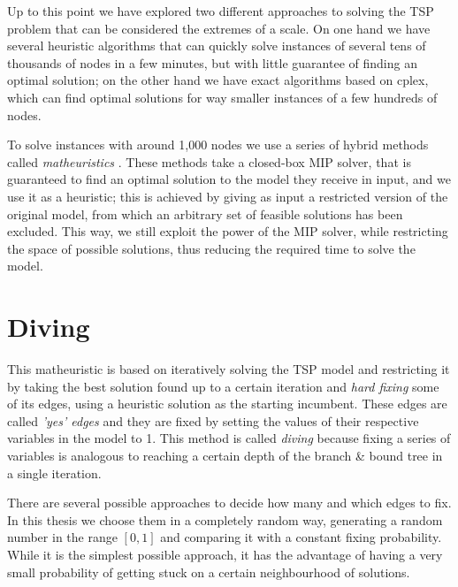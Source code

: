 Up to this point we have explored two different approaches to solving the TSP problem that can be considered the extremes of a scale. On one hand we have several heuristic algorithms that can quickly solve instances of several tens of thousands of nodes in a few minutes, but with little guarantee of finding an optimal solution; on the other hand we have exact algorithms based on cplex, which can find optimal solutions for way smaller instances of a few hundreds of nodes.

To solve instances with around 1,000 nodes we use a series of hybrid methods called \textit{matheuristics} \cite{Fischetti2016}. These methods take a closed-box MIP solver, that is guaranteed to find an optimal solution to the model they receive in input, and we use it as a heuristic; this is achieved by giving as input a restricted version of the original model, from which an arbitrary set of feasible solutions has been excluded. This way, we still exploit the power of the MIP solver, while restricting the space of possible solutions, thus reducing the required time to solve the model.

\section{Diving}

This matheuristic is based on iteratively solving the TSP model and restricting it by taking the best solution found up to a certain iteration and \textit{hard fixing} some of its edges, using a heuristic solution as the starting incumbent. These edges are called \textit{'yes' edges} and they are fixed by setting the values of their respective variables in the model to 1. This method is called \textit{diving} because fixing a series of variables is analogous to reaching a certain depth of the branch \& bound tree in a single iteration.

There are several possible approaches to decide how many and which edges to fix. In this thesis we choose them in a completely random way, generating a random number in the range $[0,1]$ and comparing it with a constant fixing probability. While it is the simplest possible approach, it has the advantage of having a very small probability of getting stuck on a certain neighbourhood of solutions.

\FloatBarrier
